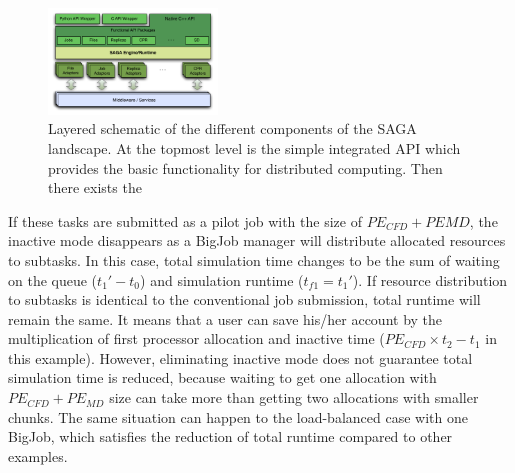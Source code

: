 \documentclass[conference,final]{IEEEtran}
\begin{document}
\begin{figure}[!ht]
  \begin{center}
      \includegraphics[width=0.40\textwidth]{stci_saga_figures-1.pdf}
  \end{center}
 \caption{\small Layered schematic of the different components
   of the SAGA landscape. At the topmost level is the simple integrated API which provides the basic functionality for distributed computing. Then there exists the} \label{sagalayer}
\end{figure}

If these tasks are submitted as a pilot job with the size of $PE_{CFD}+PE{MD}$, the inactive mode disappears as a BigJob manager will distribute allocated resources to subtasks. In this case, total simulation time changes to be the sum of waiting on the queue ($t_{1}'-t_{0}$) and simulation runtime ($t_{f1}=t_{1}'$). If resource distribution to subtasks is identical to the conventional job submission, total runtime will remain the same. It means that a user can save his/her account by the multiplication of first processor allocation and inactive time ($PE_{CFD} \times t_2-t_1$ in this example). However, eliminating inactive mode does not guarantee total simulation time is reduced, because waiting to get one allocation with $PE_{CFD}+PE_{MD}$ size can take more than getting two allocations with smaller chunks. The same situation can happen to the load-balanced case with one BigJob, which satisfies the reduction of total runtime compared to other examples.
\end{document}
